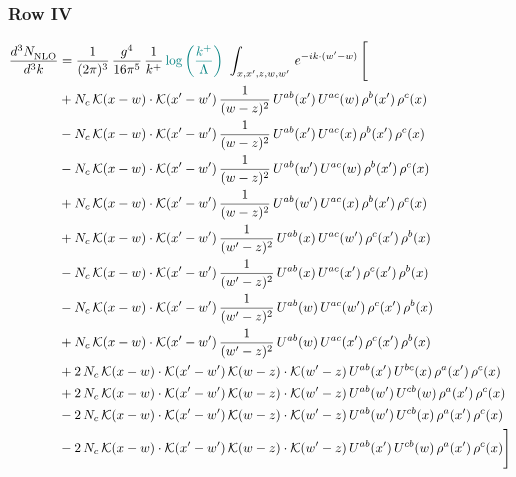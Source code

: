 \documentclass[9pt]{article}
\numberwithin{equation}{section}
\begin{document}
\subsubsection{Row IV}
\begin{align}
    \frac{d^{3}N_{\rm NLO}^{\rm}}{d^{3}k}  & = \frac{1}{(2\pi)^{3}}\,\frac{g^{4}}{16\pi^{5}}\,\frac{1}{k^{+}}\,{\color{teal}\log{\left(\frac{k^{+}}{\Lambda}\right)}}\,\,\int_{x,x',z,w,w'}\,e^{-ik\cdot(w'-w)}\,\Bigg[\notag \\ & +N_{c}\,\mathcal{K}(x-w)\cdot\mathcal{K}(x'-w')\,\frac{1}{(w-z)^{2}}\,U^{ab}(x')\,U^{ac}(w)\,\rho^{b}(x')\,\rho^{c}(x)\notag\\
&-N_{c}\,\mathcal{K}(x-w)\cdot\mathcal{K}(x'-w')\,\frac{1}{(w-z)^{2}}\,U^{ab}(x')\,U^{ac}(x)\,\rho^{b}(x')\,\rho^{c}(x)\notag\\
&-N_{c}\,\mathcal{K}(x-w)\cdot\mathcal{K}(x'-w')\,\frac{1}{(w-z)^{2}}\,U^{ab}(w')\,U^{ac}(w)\,\rho^{b}(x')\,\rho^{c}(x)\notag\\
&+N_{c}\,\mathcal{K}(x-w)\cdot\mathcal{K}(x'-w')\,\frac{1}{(w-z)^{2}}\,U^{ab}(w')\,U^{ac}(x)\,\rho^{b}(x')\,\rho^{c}(x)\notag\\
&+N_{c}\,\mathcal{K}(x-w)\cdot\mathcal{K}(x'-w')\,\frac{1}{(w'-z)^{2}}\,U^{ab}(x)\,U^{ac}(w')\,\rho^{c}(x')\,\rho^{b}(x)\notag\\
&-N_{c}\,\mathcal{K}(x-w)\cdot\mathcal{K}(x'-w')\,\frac{1}{(w'-z)^{2}}\,U^{ab}(x)\,U^{ac}(x')\,\rho^{c}(x')\,\rho^{b}(x)\notag\\
&-N_{c}\,\mathcal{K}(x-w)\cdot\mathcal{K}(x'-w')\,\frac{1}{(w'-z)^{2}}\,U^{ab}(w)\,U^{ac}(w')\,\rho^{c}(x')\,\rho^{b}(x)\notag\\
&+N_{c}\,\mathcal{K}(x-w)\cdot\mathcal{K}(x'-w')\,\frac{1}{(w'-z)^{2}}\,U^{ab}(w)\,U^{ac}(x')\,\rho^{c}(x')\,\rho^{b}(x)\notag\\
&+2\,N_{c}\,\mathcal{K}(x-w)\cdot\mathcal{K}(x'-w')\,\mathcal{K}(w-z)\cdot\mathcal{K}(w'-z)\,U^{ab}(x')\,U^{bc}(x)\,\rho^{a}(x')\,\rho^{c}(x)\notag\\
&+2\,N_{c}\,\mathcal{K}(x-w)\cdot\mathcal{K}(x'-w')\,\mathcal{K}(w-z)\cdot\mathcal{K}(w'-z)\,U^{ab}(w')\,U^{cb}(w)\,\rho^{a}(x')\,\rho^{c}(x)\notag\\
&-2\,N_{c}\,\mathcal{K}(x-w)\cdot\mathcal{K}(x'-w')\,\mathcal{K}(w-z)\cdot\mathcal{K}(w'-z)\,U^{ab}(w')\,U^{cb}(x)\,\rho^{a}(x')\,\rho^{c}(x)\notag\\
&-2\,N_{c}\,\mathcal{K}(x-w)\cdot\mathcal{K}(x'-w')\,\mathcal{K}(w-z)\cdot\mathcal{K}(w'-z)\,U^{ab}(x')\,U^{cb}(w)\,\rho^{a}(x')\,\rho^{c}(x)\Bigg]
\end{align}
\end{document}
